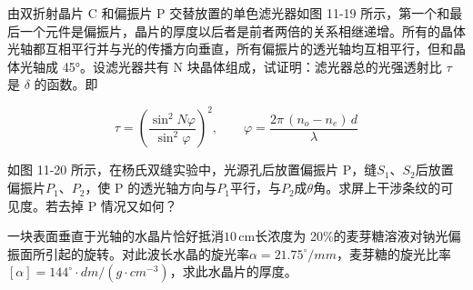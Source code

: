 \documentclass[standard, analysis, notocnum]{ExBook}
\newcommand{\answerarea}[1][8cm]{%
  \par\vspace{2mm}%
  \noindent{\color{themeColor!35}\rule{\linewidth}{0.4pt}}\par
  \noindent\begin{minipage}[t][#1][t]{\linewidth}\vspace{0pt}\end{minipage}\par
  \noindent{\color{themeColor!35}\rule{\linewidth}{0.4pt}}\par
}
\begin{document}
\begin{qitems}[startnum=10]
\qitem 由双折射晶片 C 和偏振片 P 交替放置的单色滤光器如图 11-19 所示，第一个和最后一个元件是偏振片，晶片的厚度以后者是前者两倍的关系相继递增。所有的晶体光轴都互相平行并与光的传播方向垂直，所有偏振片的透光轴均互相平行，但和晶体光轴成 45°。设滤光器共有 N 块晶体组成，试证明：滤光器总的光强透射比 $\tau$ 是 $\delta$ 的函数。即

\par\vspace{2mm}
\[
\tau=\left(\frac{\sin^{2}N\varphi}{\sin^{2}\varphi}\right)^{2},
\qquad
\varphi=\frac{2\pi\,(n_{o}-n_{e})\,d}{\lambda}
\]

\label{q:281:start}
\answerarea[8cm]
\label{q:281:end}
\end{qitems}

\begin{qitems}[startnum=11]
\qitem 如图 11-20 所示，在杨氏双缝实验中，光源孔后放置偏振片 P，缝$S_{1}$、$S_{2}$后放置偏振片$P_{1}$、$P_{2}$，使 P 的透光轴方向与$P_{1}$平行，与$P_{2}$成$\theta$角。求屏上干涉条纹的可见度。若去掉 P 情况又如何？
\label{q:282:start}
\answerarea[8cm]
\label{q:282:end}
\end{qitems}

\begin{qitems}[startnum=12]
\qitem 一块表面垂直于光轴的水晶片恰好抵消$10\,\mathrm{cm}$长浓度为 20\%的麦芽糖溶液对钠光偏振面所引起的旋转。对此波长水晶的旋光率$\alpha =21.75^{\circ}/mm$，麦芽糖的旋光比率$[\alpha ]=144^{\circ}\cdot dm/(g\cdot cm^{-3})$，求此水晶片的厚度。
\label{q:283:start}
\answerarea[8cm]
\label{q:283:end}
\end{qitems}
\end{document}
